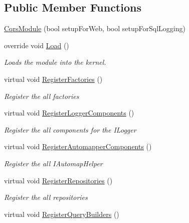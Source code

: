 \subsection*{Public Member Functions}
\begin{DoxyCompactItemize}
\item 
\hyperlink{classCqrs_1_1Ninject_1_1Configuration_1_1CqrsModule_a59949d92c89d73b9edf2ee92397d5cb4}{Cqrs\+Module} (bool setup\+For\+Web, bool setup\+For\+Sql\+Logging)
\item 
override void \hyperlink{classCqrs_1_1Ninject_1_1Configuration_1_1CqrsModule_a8cf4c81c21496699b2f32112b23308fe}{Load} ()
\begin{DoxyCompactList}\small\item\em Loads the module into the kernel. \end{DoxyCompactList}\item 
virtual void \hyperlink{classCqrs_1_1Ninject_1_1Configuration_1_1CqrsModule_afae0f84460f7cf9d1f9b62ec148b02ad}{Register\+Factories} ()
\begin{DoxyCompactList}\small\item\em Register the all factories \end{DoxyCompactList}\item 
virtual void \hyperlink{classCqrs_1_1Ninject_1_1Configuration_1_1CqrsModule_a7bb448b4c38d7a4628a30ba709dc8a36}{Register\+Logger\+Components} ()
\begin{DoxyCompactList}\small\item\em Register the all components for the I\+Logger \end{DoxyCompactList}\item 
virtual void \hyperlink{classCqrs_1_1Ninject_1_1Configuration_1_1CqrsModule_a5c3b6741270b2cb16aa1a1a84c57041b}{Register\+Automapper\+Components} ()
\begin{DoxyCompactList}\small\item\em Register the all I\+Automap\+Helper \end{DoxyCompactList}\item 
virtual void \hyperlink{classCqrs_1_1Ninject_1_1Configuration_1_1CqrsModule_a3437afb1ea306ff4e65eb2ca22a276d9}{Register\+Repositories} ()
\begin{DoxyCompactList}\small\item\em Register the all repositories \end{DoxyCompactList}\item 
virtual void \hyperlink{classCqrs_1_1Ninject_1_1Configuration_1_1CqrsModule_afc0f6417f69d5424fe7bba7a6724970f}{Register\+Query\+Builders} ()

\end{DoxyCompactItemize}
